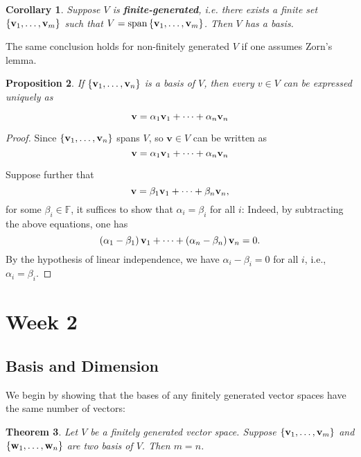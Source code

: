 \documentclass[11pt]{article}
\newtheorem{theorem}{Theorem}[section]
\newtheorem{corollary}[theorem]{Corollary}
\newtheorem{proposition}[theorem]{Proposition}
\begin{document}
\begin{corollary}
Suppose \(V\) is {\bf finite-generated}, i.e. there exists a finite set $\{{\bf v}_1,\ldots ,{\bf v}_{m}\}$ such that $V = \operatorname{span}\left\{{\bf v}_1,\ldots ,{\bf v}_{m}\right\}$.
Then \(V\) has a basis. 
\end{corollary}
The same conclusion holds for non-finitely generated \(V\) if one assumes Zorn's lemma.


\begin{proposition} If \(\left\{  {{\bf v}_1,\ldots ,{\bf v}_n}\right\}\) is a basis of \(V\), then every \(v \in  V\) can be expressed uniquely as

\[
\mathbf{v} = \alpha_1{\bf v}_1 + \cdots  + \alpha_n{\bf v}_n
\]
\end{proposition}

\begin{proof} Since \(\left\{  {{\bf v}_1,\ldots ,{\bf v}_n}\right\}\) spans \(V\), so \(\mathbf{v} \in  V\) can be written as
\[
\mathbf{v} = \alpha_1{\bf v}_1 + \cdots  + \alpha_n{\bf v}_n
\]

Suppose further that
\[
\mathbf{v} = \beta_1{\bf v}_1 + \cdots  + \beta_n{\bf v}_n,
\]
for some $\beta_i \in \mathbb{F}$, it suffices to show that \(\alpha_{i} = \beta_{i}\) for all \(i\): Indeed, by subtracting the above equations, one has
\[
\left( {\alpha_1 - \beta_1}\right) {\bf v}_1 + \cdots  + \left( {\alpha_n - \beta_n}\right) {\bf v}_n = 0.
\]
By the hypothesis of linear independence, we have \(\alpha_{i} - \beta_{i} = 0\) for all \(i\), i.e., \(\alpha_{i} = \beta_{i}\).
\end{proof}

\newpage
\section{Week 2}
\subsection{Basis and Dimension}
We begin by showing that the bases of any finitely generated vector spaces have the same number of vectors:
\begin{theorem} Let \(V\) be a finitely generated vector space. Suppose \(\left\{  {{\bf v}_1,\ldots ,{\bf v}_{m}}\right\}\) and \(\left\{  {{\bf w}_1,\ldots ,{\bf w}_n}\right\}\) are two basis of \(V\). Then \(m = n\). 
\end{theorem}
\end{document}
